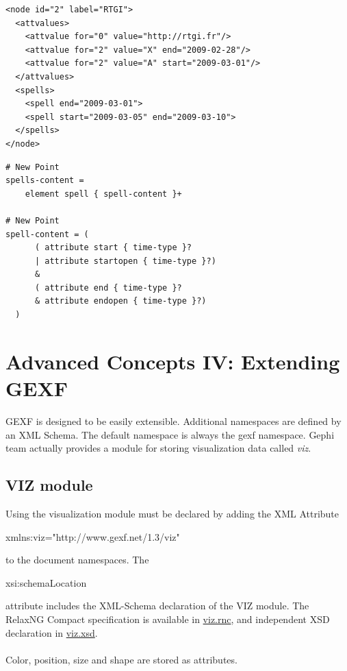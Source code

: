 \documentclass[a4paper,10pt]{article}
\begin{document}
\lstset{ style=gexf }
\begin{lstlisting}[caption={Spells}]
<node id="2" label="RTGI">
  <attvalues>
    <attvalue for="0" value="http://rtgi.fr"/>
    <attvalue for="2" value="X" end="2009-02-28"/>
    <attvalue for="2" value="A" start="2009-03-01"/>
  </attvalues>
  <spells>
    <spell end="2009-03-01">
    <spell start="2009-03-05" end="2009-03-10">
  </spells>
</node>
\end{lstlisting}

\lstset{ style=rnc }
\begin{lstlisting}[caption={Spells Specification},label=dynspellsRNC]
# New Point
spells-content =
    element spell { spell-content }+

# New Point
spell-content = (
      ( attribute start { time-type }?
      | attribute startopen { time-type }?)
      &
      ( attribute end { time-type }?
      & attribute endopen { time-type }?)
  )
\end{lstlisting}

\section{Advanced Concepts IV: Extending GEXF} \label{extendgexf}

GEXF is designed to be easily extensible. Additional namespaces are defined by an XML Schema. The default namespace is always the gexf namespace. Gephi team actually provides a module for storing visualization data called \textit{viz}.

\subsection{VIZ module} \label{viz}

Using the visualization module must be declared by adding the XML Attribute \begin{footnotesize}xmlns:viz="http://www.gexf.net/1.3/viz"\end{footnotesize} to the document namespaces. The \begin{footnotesize}xsi:schemaLocation\end{footnotesize} attribute includes the XML-Schema declaration of the VIZ module. The RelaxNG Compact specification is available in \href{http://www.gexf.net/1.3/viz.rnc}{viz.rnc}, and independent XSD declaration in \href{http://www.gexf.net/1.3/viz.xsd}{viz.xsd}.

\paragraph{}
Color, position, size and shape are stored as attributes.
\end{document}
